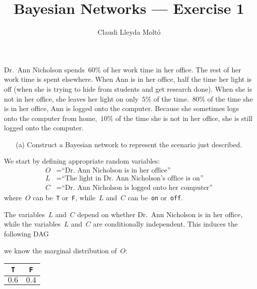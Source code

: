 \documentclass[a4paper]{article}
\title{Bayesian Networks --- Exercise 1}
\author{Claudi Lleyda Moltó}
\begin{document}
\maketitle

Dr.\ Ann Nicholson spends~\(60\%\) of her work time in her office. The rest of
her work time is spent elsewhere. When Ann is in her office, half the time her
light is off (when she is trying to hide from students and get research done).
When she is not in her office, she leaves her light on only~\(5\%\) of the
time.~\(80\%\) of the time she is in her office, Ann is logged onto the
computer.  Because she sometimes logs onto the computer from home,~\(10\%\) of
the time she is not in her office, she is still logged onto the computer.

\begin{enumerate}
    \item[(a)] Construct a Bayesian network to represent the scenario just
        described.
\end{enumerate}

We start by defining appropriate random variables:
\begin{align*}
    O &= \textrm{``Dr.\ Ann Nicholson is in her office''} \\
    L &= \textrm{``The light in Dr.\ Ann Nicholson's office is on''} \\
    C &= \textrm{``Dr.\ Ann Nicholson is logged onto her computer''}
\end{align*}
where~\(O\) can be~\texttt{T} or~\texttt{F}, while~\(L\) and~\(C\) can
be~\texttt{on} or~\texttt{off}.

The variables~\(L\) and~\(C\) depend on whether Dr.\ Ann Nicholson is in her
office, while the variables~\(L\) and~\(C\) are conditionally independent. This
induces the following DAG

\begin{center}
\end{center}

we know the marginal distribution of~\(O\):
\begin{center}
    \begin{tabular}{cc}
        \texttt{T} & \texttt{F} \\ \hline
        \(0.6\) & \(0.4\)
    \end{tabular}
\end{center}
\end{document}
